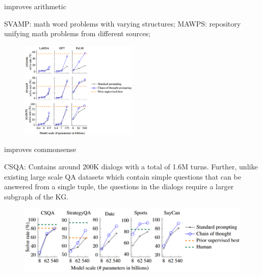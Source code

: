 \begin{vbframe}{\cotp improves arithmetic}


SVAMP: math word problems with varying structures; MAWPS:
repository unifying math problems from different sources;

\begin{figure}
    \centering
    \includegraphics[width=0.5\textwidth]{figure/cot_performance1.png}
\end{figure}


\end{vbframe}


\begin{vbframe}{\cotp improves commonsense}

\vfill

CSQA: Contains around 200K dialogs with a total of 1.6M
turns. Further, unlike existing large scale QA datasets
which contain simple questions that can be answered from a
single tuple, the questions in the dialogs require a larger
subgraph of the KG. 


\begin{figure}
    \centering
    \includegraphics{figure/cot_performance2.png}\\
\end{figure}

\vfill

\end{vbframe}


